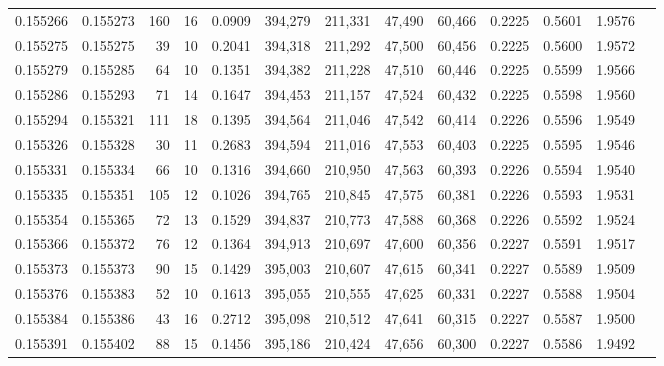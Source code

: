 \begin{tabular}{rrrrrrrrrrrrr}
0.155266 & 0.155273 &   160 &  16 &                                     0.0909 & 394,279 & 211,331 &  47,490 &  60,466 & 0.2225 & 0.5601 & 1.9576 \\
0.155275 & 0.155275 &    39 &  10 &                                     0.2041 & 394,318 & 211,292 &  47,500 &  60,456 & 0.2225 & 0.5600 & 1.9572 \\
0.155279 & 0.155285 &    64 &  10 &                                     0.1351 & 394,382 & 211,228 &  47,510 &  60,446 & 0.2225 & 0.5599 & 1.9566 \\
0.155286 & 0.155293 &    71 &  14 &                                     0.1647 & 394,453 & 211,157 &  47,524 &  60,432 & 0.2225 & 0.5598 & 1.9560 \\
0.155294 & 0.155321 &   111 &  18 &                                     0.1395 & 394,564 & 211,046 &  47,542 &  60,414 & 0.2226 & 0.5596 & 1.9549 \\
0.155326 & 0.155328 &    30 &  11 &                                     0.2683 & 394,594 & 211,016 &  47,553 &  60,403 & 0.2225 & 0.5595 & 1.9546 \\
0.155331 & 0.155334 &    66 &  10 &                                     0.1316 & 394,660 & 210,950 &  47,563 &  60,393 & 0.2226 & 0.5594 & 1.9540 \\
0.155335 & 0.155351 &   105 &  12 &                                     0.1026 & 394,765 & 210,845 &  47,575 &  60,381 & 0.2226 & 0.5593 & 1.9531 \\
0.155354 & 0.155365 &    72 &  13 &                                     0.1529 & 394,837 & 210,773 &  47,588 &  60,368 & 0.2226 & 0.5592 & 1.9524 \\
0.155366 & 0.155372 &    76 &  12 &                                     0.1364 & 394,913 & 210,697 &  47,600 &  60,356 & 0.2227 & 0.5591 & 1.9517 \\
0.155373 & 0.155373 &    90 &  15 &                                     0.1429 & 395,003 & 210,607 &  47,615 &  60,341 & 0.2227 & 0.5589 & 1.9509 \\
0.155376 & 0.155383 &    52 &  10 &                                     0.1613 & 395,055 & 210,555 &  47,625 &  60,331 & 0.2227 & 0.5588 & 1.9504 \\
0.155384 & 0.155386 &    43 &  16 &                                     0.2712 & 395,098 & 210,512 &  47,641 &  60,315 & 0.2227 & 0.5587 & 1.9500 \\
0.155391 & 0.155402 &    88 &  15 &                                     0.1456 & 395,186 & 210,424 &  47,656 &  60,300 & 0.2227 & 0.5586 & 1.9492 \\

\end{tabular}
